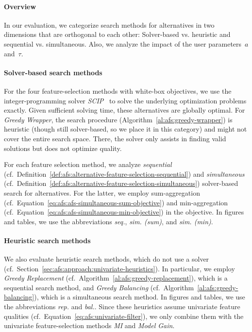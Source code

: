 \documentclass{article}
\theoremstyle{definition}
\begin{document}
\paragraph{Overview}

In our evaluation, we categorize search methods for alternatives in two dimensions that are orthogonal to each other:
Solver-based vs. heuristic and sequential vs. simultaneous.
Also, we analyze the impact of the user parameters~$a$ and~$\tau$.

\paragraph{Solver-based search methods}

For the four feature-selection methods with white-box objectives, we use the integer-programming solver \emph{SCIP}~\cite{bestuzheva2021scip} to solve the underlying optimization problems exactly.
Given sufficient solving time, these alternatives are globally optimal.
For \emph{Greedy Wrapper}, the search procedure (Algorithm~\ref{al:afs:greedy-wrapper}) is heuristic (though still solver-based, so we place it in this category) and might not cover the entire search space.
There, the solver only assists in finding valid solutions but does not optimize quality.

For each feature selection method, we analyze \emph{sequential} (cf.~Definition~\ref{def:afs:alternative-feature-selection-sequential}) and \emph{simultaneous} (cf.~Definition~\ref{def:afs:alternative-feature-selection-simultaneous}) solver-based search for alternatives.
For the latter, we employ sum-aggregation (cf.~Equation~\ref{eq:afs:afs-simultaneous-sum-objective}) and min-aggregation (cf.~Equation~\ref{eq:afs:afs-simultaneous-min-objective}) in the objective.
In figures and tables, we use the abbreviations \emph{seq.}, \emph{sim. (sum)}, and \emph{sim. (min)}.

\paragraph{Heuristic search methods}

We also evaluate heuristic search methods, which do not use a solver (cf.~Section~\ref{sec:afs:approach:univariate-heuristics}).
In particular, we employ \emph{Greedy Replacement} (cf.~Algorithm~\ref{al:afs:greedy-replacement}), which is a sequential search method, and \emph{Greedy Balancing} (cf.~Algorithm~\ref{al:afs:greedy-balancing}), which is a simultaneous search method.
In figures and tables, we use the abbreviations \emph{rep.} and \emph{bal.}.
Since these heuristics assume univariate feature qualities (cf.~Equation~\ref{eq:afs:univariate-filter}), we only combine them with the univariate feature-selection methods \emph{MI} and \emph{Model Gain}.
\end{document}
